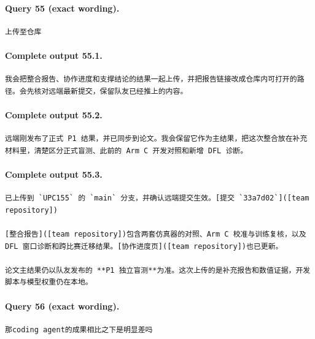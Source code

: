 \documentclass[UTF8,10pt]{ctexart}
\begin{document}
\paragraph{Query 55 (exact wording).}
\begin{Verbatim}[breaklines=true,breakanywhere=true,fontsize=\scriptsize,frame=single,framesep=2pt]
上传至仓库
\end{Verbatim}

\paragraph{Complete output 55.1.}
\begin{Verbatim}[breaklines=true,breakanywhere=true,fontsize=\scriptsize,frame=single,framesep=2pt]
我会把整合报告、协作进度和支撑结论的结果一起上传，并把报告链接改成仓库内可打开的路径。会先核对远端最新提交，保留队友已经推上的内容。
\end{Verbatim}

\paragraph{Complete output 55.2.}
\begin{Verbatim}[breaklines=true,breakanywhere=true,fontsize=\scriptsize,frame=single,framesep=2pt]
远端刚发布了正式 P1 结果，并已同步到论文。我会保留它作为主结果，把这次整合放在补充材料里，清楚区分正式盲测、此前的 Arm C 开发对照和新增 DFL 诊断。
\end{Verbatim}

\paragraph{Complete output 55.3.}
\begin{Verbatim}[breaklines=true,breakanywhere=true,fontsize=\scriptsize,frame=single,framesep=2pt]
已上传到 `UPC155` 的 `main` 分支，并确认远端提交生效。[提交 `33a7d02`]([team repository])

[整合报告]([team repository])包含两套仿真器的对照、Arm C 校准与训练复核，以及 DFL 窗口诊断和跨比赛迁移结果。[协作进度页]([team repository])也已更新。

论文主结果仍以队友发布的 **P1 独立盲测**为准。这次上传的是补充报告和数值证据，开发脚本与模型权重仍在本地。
\end{Verbatim}

\paragraph{Query 56 (exact wording).}
\begin{Verbatim}[breaklines=true,breakanywhere=true,fontsize=\scriptsize,frame=single,framesep=2pt]
那coding agent的成果相比之下是明显差吗
\end{Verbatim}
\end{document}
